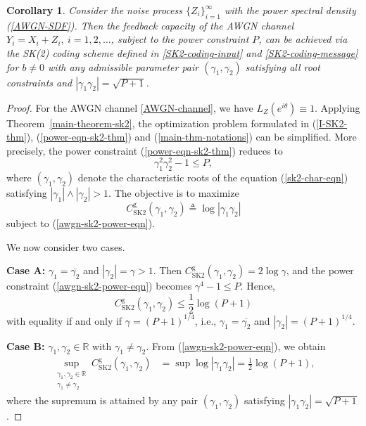 \documentclass[12pt]{article}
\newtheorem{co}[thm]{Corollary}
\begin{document}
\begin{co}\label{co-awgn-sk2:label}
Consider the noise process $\{Z_i\}_{i=1}^\infty$ with the power spectral density (\ref{AWGN-SDF}). Then the feedback capacity of the AWGN channel $Y_i = X_i +Z_i,~i=1,2,\dots$, subject to the power constraint $P$, can be achieved via the SK(2) coding scheme defined in \eqref{SK2-coding-input} and \eqref{SK2-coding-message} for $b\neq 0$ with any admissible parameter pair $(\gamma_1,\gamma_2)$ satisfying all root constraints and $|\gamma_1\gamma_2|=\sqrt{P+1}$.
\end{co}

\begin{proof}
For the AWGN channel \eqref{AWGN-channel}, we have $L_Z(e^{i\theta})\equiv 1$. Applying Theorem~\ref{main-theorem-sk2}, the optimization problem formulated in (\ref{I-SK2-thm}), (\ref{power-eqn-sk2-thm}) and (\ref{main-thm-notations}) can be simplified. More precisely, the power constraint (\ref{power-eqn-sk2-thm}) reduces to
\begin{equation}\label{awgn-sk2-power-eqn}
\gamma^2_1 \gamma^2_2-1\le P,
\end{equation}
where $(\gamma_1,\gamma_2)$ denote the characteristic roots of the equation (\ref{sk2-char-eqn}) satisfying $|\gamma_1|\wedge|\gamma_2|>1$. The objective is to maximize 
$$
C^\mathrm{g}_\mathrm{SK2}(\gamma_1,\gamma_2)\triangleq\log  |\gamma_1\gamma_2|
$$
subject to (\ref{awgn-sk2-power-eqn}).

We now consider two cases.

\textbf{Case A:} $\gamma_1 = \overline{\gamma_2}$ and $|\gamma_2| = \gamma > 1$. Then $C^\mathrm{g}_\mathrm{SK2}(\gamma_1,\gamma_2)=2\log \gamma$, and the power constraint (\ref{awgn-sk2-power-eqn}) becomes $\gamma^4-1\le P$. Hence,
\begin{equation*}
C^\mathrm{g}_\mathrm{SK2}(\gamma_1,\gamma_2)\le \frac{1}{2}\log(P+1)
\end{equation*}
with equality if and only if $\gamma = (P+1)^{1/4}$, i.e., $\gamma_1=\overline{\gamma_2}$ and $|\gamma_2|= (P+1)^{1/4}$. 

\textbf{Case B:} $\gamma_1, \gamma_2 \in \mathbb{R}$ with $\gamma_1 \neq \gamma_2$. From (\ref{awgn-sk2-power-eqn}), we obtain
\begin{equation*}
\begin{aligned}
\sup_{\substack{\gamma_1,\gamma_2\in\mathbb{R}\\\gamma_1\neq\gamma_2}} C^\mathrm{g}_{\mathrm{SK2}}(\gamma_1,\gamma_2) &= \sup \log |\gamma_1\gamma_2|= \frac{1}{2}\log(P+1),
\end{aligned}
\end{equation*}
where the supremum is attained by any pair $(\gamma_1,\gamma_2)$ satisfying $|\gamma_1\gamma_2|=\sqrt{P+1}$.


\end{proof}
\end{document}
